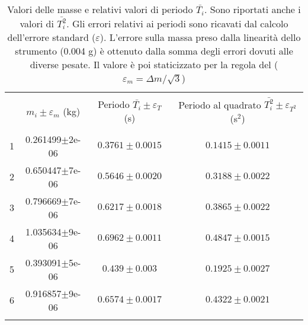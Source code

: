 \begin{table}[t]
    \centering
    \footnotesize
    \caption{Valori delle masse e relativi valori di periodo $\bar{T_i}$. Sono riportati anche i valori di
    $\bar{T_i^2}$. Gli errori relativi ai periodi sono ricavati dal calcolo dell'errore standard ($\varepsilon$). 
    L'errore sulla massa preso dalla linearità dello strumento (0.004 g) è ottenuto dalla somma degli errori dovuti 
    alle diverse pesate. Il valore è poi staticizzato per la regola del \treSigma ($\varepsilon_m = \Delta m/\sqrt{3}$)}
    \label{table:dyn_values}
    \begin{tabular}{lccc}
        \hline\hline\\[-1.5ex]
          & $m_i\pm\varepsilon_m$ (kg) & Periodo $\bar{T_i}\pm\varepsilon_T$ (s) & Periodo al quadrato $\bar{T_i^2}\pm\varepsilon_{T^2}$ (s$^2$) \\[+0.5ex] \hline \\[-1.5ex]
        1 & 0.261499$\pm$2e-06         & $0.3761\pm0.0015$                       & $0.1415\pm0.0011$                                             \\[+0.5ex]
        2 & 0.650447$\pm$7e-06         & $0.5646\pm0.0020$                       & $0.3188\pm0.0022$                                             \\[+0.5ex]
        3 & 0.796669$\pm$7e-06         & $0.6217\pm0.0018$                       & $0.3865\pm0.0022$                                             \\[+0.5ex]
        4 & 1.035634$\pm$9e-06         & $0.6962\pm0.0011$                       & $0.4847\pm0.0015$                                             \\[+0.5ex]
        5 & 0.393091$\pm$5e-06         & $0.439 \pm0.003 $                       & $0.1925\pm0.0027$                                             \\[+0.5ex]
        6 & 0.916857$\pm$9e-06         & $0.6574\pm0.0017$                       & $0.4322\pm0.0021$                                             \\[+0.5ex]
        \hline \\[-1.5ex]
        
    \end{tabular}
\end{table}

